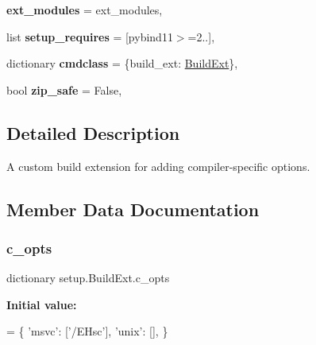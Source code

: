 \begin{DoxyCompactItemize}
\item 
\mbox{\label{classsetup_1_1BuildExt_ade2fbdb58cb8589f4200ccc45ae698b5}} 
{\bfseries ext\+\_\+modules} = ext\+\_\+modules,
\item 
\mbox{\label{classsetup_1_1BuildExt_afeefb691d731191f8d52a6e398612ea0}} 
list {\bfseries setup\+\_\+requires} = \mbox{[}\textquotesingle{}pybind11$>$=2..\textquotesingle{}\mbox{]},
\item 
\mbox{\label{classsetup_1_1BuildExt_a331bbe264b05f2da56fa133ece4b5ee0}} 
dictionary {\bfseries cmdclass} = \{\textquotesingle{}build\+\_\+ext\textquotesingle{}\+: \hyperlink{classsetup_1_1BuildExt}{Build\+Ext}\},
\item 
\mbox{\label{classsetup_1_1BuildExt_a03620bc93383f8f6667f07e5663280a6}} 
bool {\bfseries zip\+\_\+safe} = False,
\end{DoxyCompactItemize}


\subsection{Detailed Description}
\begin{DoxyVerb}A custom build extension for adding compiler-specific options.\end{DoxyVerb}
 

\subsection{Member Data Documentation}
\mbox{\label{classsetup_1_1BuildExt_ad923dda6f6197eacc466b0def10d3297}} 
\subsubsection{\texorpdfstring{c\+\_\+opts}{c\_opts}}
{\footnotesize\ttfamily dictionary setup.\+Build\+Ext.\+c\+\_\+opts\hspace{0.3cm}{\ttfamily [static]}}

{\bfseries Initial value\+:}
\begin{DoxyCode}
=  \{
        \textcolor{stringliteral}{'msvc'}: [\textcolor{stringliteral}{'/EHsc'}],
        \textcolor{stringliteral}{'unix'}: [],
    \}
\end{DoxyCode}
\mbox{\label{classsetup_1_1BuildExt_aa5c4f279d453c22552d9f48d55c29193}} 
